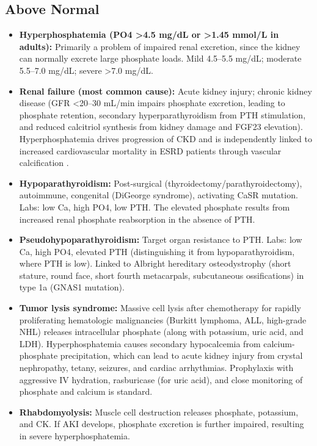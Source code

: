 \subsection*{Above Normal}
\begin{itemize}
  \item \textbf{Hyperphosphatemia (PO4 >4.5 mg/dL or >1.45 mmol/L in adults):} Primarily a problem of impaired renal excretion, since the kidney can normally excrete large phosphate loads. Mild 4.5--5.5 mg/dL; moderate 5.5--7.0 mg/dL; severe >7.0 mg/dL.
  \item \textbf{Renal failure (most common cause):} Acute kidney injury; chronic kidney disease (GFR <20--30 mL/min impairs phosphate excretion, leading to phosphate retention, secondary hyperparathyroidism from PTH stimulation, and reduced calcitriol synthesis from kidney damage and FGF23 elevation). Hyperphosphatemia drives progression of CKD and is independently linked to increased cardiovascular mortality in ESRD patients through vascular calcification \cite{kestenbaum2007phosphate}.
  \item \textbf{Hypoparathyroidism:} Post-surgical (thyroidectomy/parathyroidectomy), autoimmune, congenital (DiGeorge syndrome), activating CaSR mutation. Labs: low Ca, high PO4, low PTH. The elevated phosphate results from increased renal phosphate reabsorption in the absence of PTH.
  \item \textbf{Pseudohypoparathyroidism:} Target organ resistance to PTH. Labs: low Ca, high PO4, elevated PTH (distinguishing it from hypoparathyroidism, where PTH is low). Linked to Albright hereditary osteodystrophy (short stature, round face, short fourth metacarpals, subcutaneous ossifications) in type 1a (GNAS1 mutation).
  \item \textbf{Tumor lysis syndrome:} Massive cell lysis after chemotherapy for rapidly proliferating hematologic malignancies (Burkitt lymphoma, ALL, high-grade NHL) releases intracellular phosphate (along with potassium, uric acid, and LDH). Hyperphosphatemia causes secondary hypocalcemia from calcium-phosphate precipitation, which can lead to acute kidney injury from crystal nephropathy, tetany, seizures, and cardiac arrhythmias. Prophylaxis with aggressive IV hydration, rasburicase (for uric acid), and close monitoring of phosphate and calcium is standard.
  \item \textbf{Rhabdomyolysis:} Muscle cell destruction releases phosphate, potassium, and CK. If AKI develops, phosphate excretion is further impaired, resulting in severe hyperphosphatemia.

\end{itemize}

